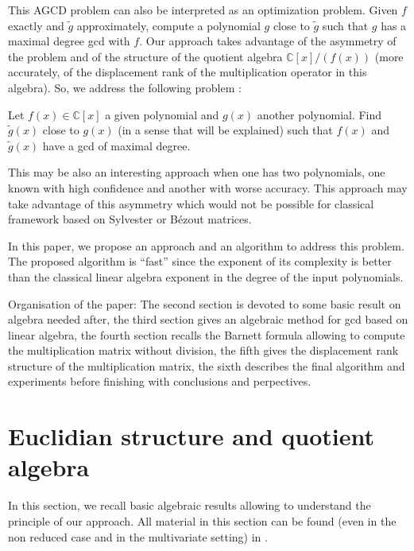 \documentclass{article}
\begin{document}
This AGCD problem can also be interpreted as an optimization problem. Given
$f$ exactly and $\tilde{g}$ approximately, compute a polynomial $g$ close to
$\tilde{g}$ such that $g$ has a maximal degree gcd with $f$. Our approach
takes advantage of the asymmetry of the problem and of the structure of the
quotient algebra $\mathbb{C}[x] / (f (x))$ (more accurately, of the
displacement rank of the multiplication operator in this algebra). So, we
address the following problem :



\begin{problem}
  Let $f (x) \in \mathbb{C}[x]$ a given polynomial and $g (x)$ another
  polynomial. Find $\tilde{g} (x)$ close to $g (x)$ (in a sense that will be
  explained) such that $f (x)$ and $\tilde{g} (x)$ have a gcd of maximal
  degree. \ 
\end{problem}

This may be also an interesting approach when one has two polynomials, one
known with high confidence and another with worse accuracy. This approach may
take advantage of this asymmetry which would not be possible for classical
framework based on Sylvester or B\'ezout matrices.



In this paper, we propose an approach and an algorithm to address this
problem. The proposed algorithm is ``fast'' since the exponent of its
complexity is better than the classical linear algebra exponent in the degree
of the input polynomials.

Organisation of the paper: The second section is devoted to some basic result
on algebra needed after, the third section gives an algebraic method for gcd
based on linear algebra, the fourth section recalls the Barnett formula
allowing to compute the multiplication matrix without division, the fifth
gives the displacement rank structure of the multiplication matrix, the sixth
describes the final algorithm and experiments before finishing with
conclusions and perpectives.

\section{Euclidian structure and quotient algebra\label{quot}}



In this section, we recall basic algebraic results allowing to understand the
principle of our approach. All material in this section can be found (even in
the non reduced case and in the multivariate setting) in {\cite{R}}. \
\end{document}
